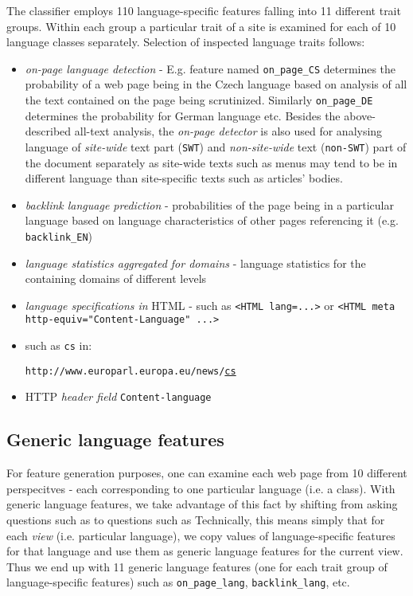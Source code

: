 \documentclass[12pt,a4paper]{article}     %
\begin{document}
  The classifier employs 110 language-specific features falling into 11 different trait groups. Within each group a
  particular trait of a site is examined for each of 10 language classes separately. Selection of
  inspected language traits follows: 
  \begin{itemize}
    \item \textit{on-page language detection} - E.g. feature named \texttt{on\_page\_CS} determines the
      probability of a web page being in the Czech language based on analysis of all the text
      contained on the page being scrutinized. Similarly \texttt{on\_page\_DE} determines the
      probability for German language etc. Besides the above-described all-text analysis, the \textit{on-page 
      detector} is also used for analysing language of \textit{site-wide} text part (\texttt{SWT}) and
    \textit{non-site-wide} text (\texttt{non-SWT}) part of the document separately as site-wide texts 
      such as menus may tend to be in different language than site-specific texts such as articles' bodies.
    \item \textit{backlink language prediction} - probabilities of the page being in a particular
      language based on language characteristics of other pages referencing it (e.g.
      \texttt{backlink\_EN})
    \item \textit{language statistics aggregated for domains} - language statistics for the
      containing domains of different levels
    \item \textit{language specifications in} HTML - such as \texttt{<HTML lang=...>} or \texttt{<HTML
      meta http-equiv="Content-Language"  ...>}
    \item {} such as \texttt{cs} in:

    \texttt{http://www.europarl.europa.eu/news/}\underline{\texttt{cs}} 
    \item HTTP \textit{header field} \texttt{Content-language}
  \end{itemize}

  \subsection{Generic language features}
    For feature generation purposes, one can examine each web page from 10 different perspecitves -
    each corresponding to one particular language (i.e. a class). With generic language features, we
    take advantage of this fact by shifting from asking questions such as  to questions 
    such as  Technically, this means simply
    that for each \textit{view} (i.e. particular language), we copy values of language-specific
    features for that language and use them as generic language features for the current view. Thus
    we end up with 11 generic language features (one for each trait group of language-specific
    features) such as \texttt{on\_page\_lang}, \texttt{backlink\_lang}, etc.
\end{document}
